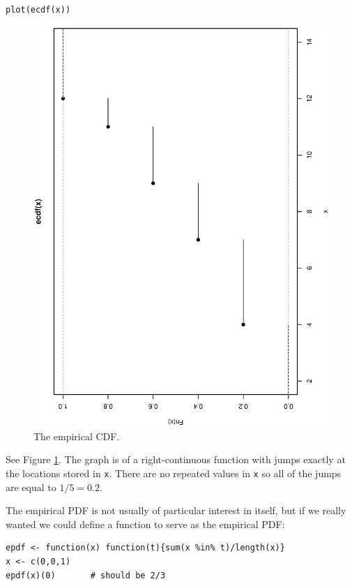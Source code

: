 \documentclass[captions=tableheading]{scrbook}
\begin{document}
\begin{verbatim}
plot(ecdf(x))
\end{verbatim}



\begin{figure}[th]
    \includegraphics[angle=270, totalheight=4in]{img/empirical-CDF.ps}
    \caption[The empirical CDF]{\small The empirical CDF.}
    \label{fig:empirical-CDF}
  \end{figure}

See Figure \ref{fig:empirical-CDF}. The graph is of a right-continuous function with jumps exactly at the locations stored in \texttt{x}. There are no repeated values in \texttt{x} so all of the jumps are equal to \(1/5=0.2\).

The empirical PDF is not usually of particular interest in itself, but if we really wanted we could define a function to serve as the empirical PDF:


\begin{verbatim}
epdf <- function(x) function(t){sum(x %in% t)/length(x)}
x <- c(0,0,1)
epdf(x)(0)       # should be 2/3
\end{verbatim}
\end{document}
